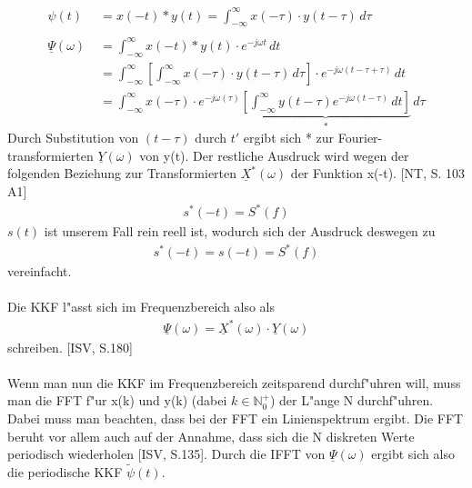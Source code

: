 \begin{align}
\psi(t) \  \; &= x(-t) * y(t) = \int_{-\infty}^{\infty} x(-\tau) \cdot y(t-\tau)\,d\tau\\\\
\underline \Psi(\omega) &=\int_{-\infty}^{\infty} x(-t) * y(t) \cdot e^{-j\omega t} \,dt\\&=\int_{-\infty}^{\infty} \left[ \int_{-\infty}^{\infty} x(-\tau) \cdot y(t-\tau)\,d\tau \right] \cdot e^{-j\omega (t - \tau + \tau)} \,dt\\&=\int_{-\infty}^{\infty} x(-\tau) \cdot e^{-j\omega(\tau)} \underbrace{ \left[ \int_{-\infty}^{\infty} y(t-\tau) e^{-j\omega (t - \tau)} \,dt \right]}_* \,d\tau
\end{align}
Durch Substitution von $(t-\tau)$ durch $t'$ ergibt sich * zur Fourier-transformierten $ \underline{Y}(\omega)$ von y(t). Der restliche Ausdruck wird wegen der folgenden Beziehung zur Transformierten $ \underline{X}^*(\omega)$ der Funktion x(-t). [NT, S. 103 A1]
\begin{align}
s^*(-t) = S^*(f)
\end{align}
$s(t)$ ist unserem Fall rein reell ist, wodurch sich der Ausdruck deswegen zu
\begin{align}
s^*(-t) = s(-t) = S^*(f)
\end{align}
vereinfacht.\\\\
Die KKF l"asst sich im Frequenzbereich also als
\begin{align}
\boxed{\underline \Psi(\omega) = \underline{X}^*(\omega) \cdot \underline{Y}(\omega)}
\end{align}
schreiben. [ISV, S.180]
\\\\
Wenn man nun die KKF im Frequenzbereich zeitsparend durchf"uhren will, muss man die FFT f"ur x(k) und y(k) (dabei $k \in \mathbb{N}^+_0$) der L"ange N durchf"uhren. Dabei muss man beachten, dass bei der FFT ein Linienspektrum ergibt. Die FFT beruht vor allem auch auf der Annahme, dass sich die N diskreten Werte periodisch wiederholen [ISV, S.135]. Durch die IFFT von $ \underline \Psi(\omega)$ ergibt sich also die periodische KKF $\tilde{\psi}(t)$.
